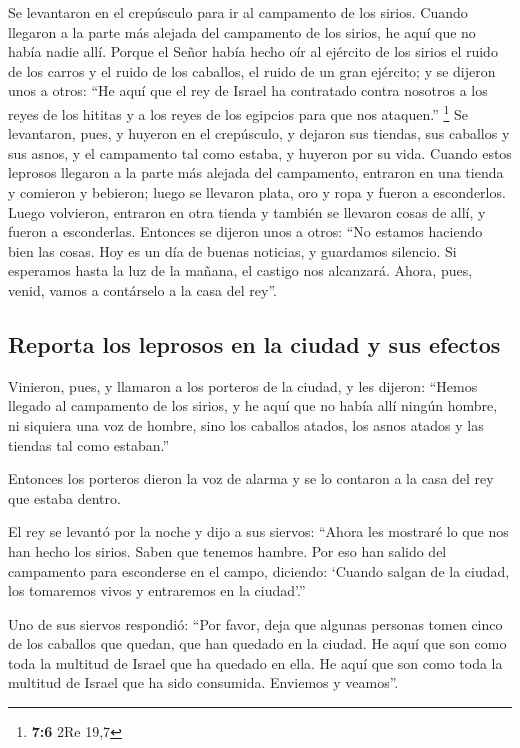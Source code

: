 \begin{paracol}{2}
 Se levantaron en el crepúsculo para ir al campamento de
los sirios. Cuando llegaron a la parte más alejada del campamento de los
sirios, he aquí que no había nadie allí.  Porque el Señor
había hecho oír al ejército de los sirios el ruido de los carros y el
ruido de los caballos, el ruido de un gran ejército; y se dijeron unos a
otros: ``He aquí que el rey de Israel ha contratado contra nosotros a
los reyes de los hititas y a los reyes de los egipcios para que nos
ataquen.'' \footnote{\textbf{7:6} 2Re 19,7}  Se
levantaron, pues, y huyeron en el crepúsculo, y dejaron sus tiendas, sus
caballos y sus asnos, y el campamento tal como estaba, y huyeron por su
vida.  Cuando estos leprosos llegaron a la parte más
alejada del campamento, entraron en una tienda y comieron y bebieron;
luego se llevaron plata, oro y ropa y fueron a esconderlos. Luego
volvieron, entraron en otra tienda y también se llevaron cosas de allí,
y fueron a esconderlas.  Entonces se dijeron unos a otros:
``No estamos haciendo bien las cosas. Hoy es un día de buenas noticias,
y guardamos silencio. Si esperamos hasta la luz de la mañana, el castigo
nos alcanzará. Ahora, pues, venid, vamos a contárselo a la casa del
rey''.

\hypertarget{reporta-los-leprosos-en-la-ciudad-y-sus-efectos}{%
\subsection{Reporta los leprosos en la ciudad y sus
efectos}\label{reporta-los-leprosos-en-la-ciudad-y-sus-efectos}}

 Vinieron, pues, y llamaron a los porteros de la ciudad,
y les dijeron: ``Hemos llegado al campamento de los sirios, y he aquí
que no había allí ningún hombre, ni siquiera una voz de hombre, sino los
caballos atados, los asnos atados y las tiendas tal como estaban.''

 Entonces los porteros dieron la voz de alarma y se lo
contaron a la casa del rey que estaba dentro.

 El rey se levantó por la noche y dijo a sus siervos:
``Ahora les mostraré lo que nos han hecho los sirios. Saben que tenemos
hambre. Por eso han salido del campamento para esconderse en el campo,
diciendo: `Cuando salgan de la ciudad, los tomaremos vivos y entraremos
en la ciudad'.''

 Uno de sus siervos respondió: ``Por favor, deja que
algunas personas tomen cinco de los caballos que quedan, que han quedado
en la ciudad. He aquí que son como toda la multitud de Israel que ha
quedado en ella. He aquí que son como toda la multitud de Israel que ha
sido consumida. Enviemos y veamos''.


\end{paracol}
